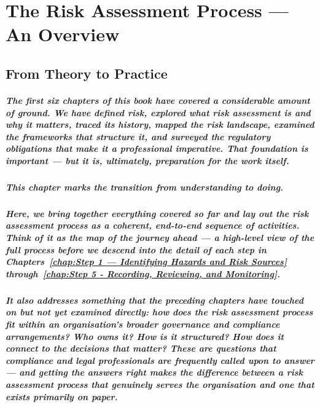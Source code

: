 \chapter{The Risk Assessment Process — An Overview}
\label{chap:The Risk Assessment Process — An Overview}

\section{From Theory to Practice}
\paragraph{The first six chapters of this book have covered a considerable amount of ground. We have defined risk, explored what risk assessment is and why it matters, traced its history, mapped the risk landscape, examined the frameworks that structure it, and surveyed the regulatory obligations that make it a professional imperative. That foundation is important — but it is, ultimately, preparation for the work itself.}
\paragraph{This chapter marks the transition from understanding to doing.}
\paragraph{Here, we bring together everything covered so far and lay out the risk assessment process as a coherent, end-to-end sequence of activities. Think of it as the map of the journey ahead — a high-level view of the full process before we descend into the detail of each step in Chapters~\ref{chap:Step 1 — Identifying Hazards and Risk Sources} through~\ref{chap:Step 5 - Recording, Reviewing, and Monitoring}.}
\paragraph{It also addresses something that the preceding chapters have touched on but not yet examined directly: how does the risk assessment process fit within an organisation's broader governance and compliance arrangements? Who owns it? How is it structured? How does it connect to the decisions that matter? These are questions that compliance and legal professionals are frequently called upon to answer — and getting the answers right makes the difference between a risk assessment process that genuinely serves the organisation and one that exists primarily on paper.}

